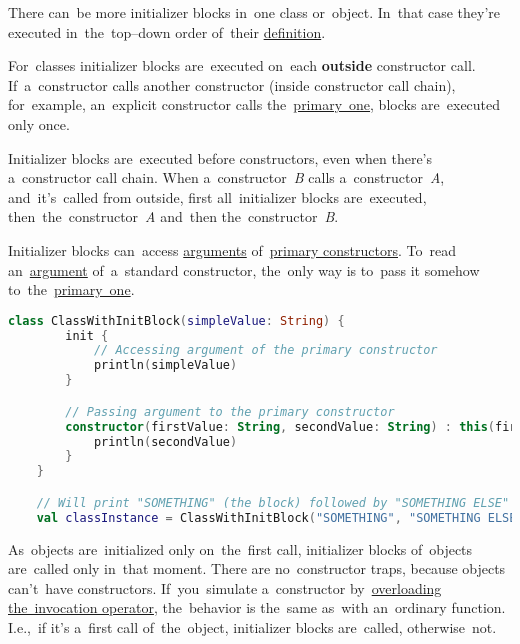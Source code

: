 There can~be more initializer blocks in~one class or~object.
In~that case they're executed in~the~top--down order of~their \hyperref[declarationdefinition]{definition}.

For~classes initializer blocks are~executed on~each \textbf{outside} constructor call.
If~a~constructor calls another constructor (inside constructor call chain), for~example, an~explicit constructor calls the~\hyperref[kotlinprimaryconstructor]{primary~one}, blocks are~executed only once.

Initializer blocks are~executed before constructors, even when there's a~constructor call chain.
When a~constructor~\textit{B} calls a~constructor~\textit{A}, and~it's~called from outside, first all~initializer blocks are~executed, then~the~constructor~\textit{A} and~then the~constructor~\textit{B}.

Initializer blocks can~access \hyperref[parameterargument]{arguments} of~\hyperref[kotlinprimaryconstructor]{primary constructors}.
To~read an~\hyperref[parameterargument]{argument} of~a~standard constructor, the~only way is to~pass it somehow to~the~\hyperref[kotlinprimaryconstructor]{primary~one}.

\begin{lstlisting}[language=Kotlin]
    class ClassWithInitBlock(simpleValue: String) {
        init {
            // Accessing argument of the primary constructor
            println(simpleValue)
        }

        // Passing argument to the primary constructor
        constructor(firstValue: String, secondValue: String) : this(firstValue) {
            println(secondValue)
        }
    }

    // Will print "SOMETHING" (the block) followed by "SOMETHING ELSE" (the constructor)
    val classInstance = ClassWithInitBlock("SOMETHING", "SOMETHING ELSE")
\end{lstlisting}

\label{objectinitblock}
As~objects are~initialized only on~the~first call, initializer blocks of~objects are~called only in~that moment.
There are no~constructor traps, because objects can't~have constructors.
If~you~simulate a~constructor by~\hyperref[kotlinoperatoroverload]{overloading the~invocation operator}, the~behavior is the~same as~with an~ordinary function.
I.e.,~if it's a~first call of~the~object, initializer blocks are~called, otherwise~not.

